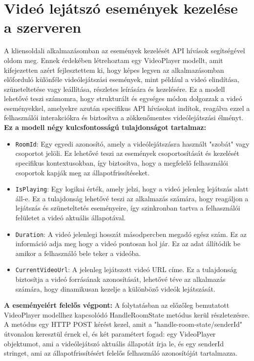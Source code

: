 \section{Videó lejátszó események kezelése a szerveren}
A kliensoldali alkalmazásomban az események kezelését API hívások segítségével oldom meg. Ennek érdekében létrehoztam egy VideoPlayer modellt, amit kifejezetten azért fejlesztettem ki, hogy képes legyen az alkalmazásomban előforduló különféle videólejátszási események, mint például a videó elindítása, szüneteltetése vagy leállítása, részletes leírására és kezelésére. Ez a modell lehetővé teszi számomra, hogy strukturált és egységes módon dolgozzak a videó eseményekkel, amelyekre azután specifikus API hívásokat indítok, reagálva ezzel a felhasználói interakciókra és biztosítva a zökkenőmentes videólejátszási élményt.
\vspace{1em}
\\
\textbf{Ez a modell négy kulcsfontosságú tulajdonságot tartalmaz:}
\begin{itemize}
\item \texttt{RoomId}: Egy egyedi azonosító, amely a videólejátszásra használt "szobát" vagy csoportot jelöli. Ez lehetővé teszi az események csoportosítását és kezelését specifikus kontextusokban, így biztosítva, hogy a megfelelő felhasználói csoportok kapják meg az állapotfrissítéseket.

\item \texttt{IsPlaying}: Egy logikai érték, amely jelzi, hogy a videó jelenleg lejátszás alatt áll-e. Ez a tulajdonság lehetővé teszi az alkalmazás számára, hogy reagáljon a lejátszás és szüneteltetés eseményeire, így szinkronban tartva a felhasználói felületet a videó aktuális állapotával.

\item \texttt{Duration}: A videó jelenlegi hosszát másodpercben megadó egész szám. Ez az információ adja meg hogy a videó pontosan hol jár. Ez az adat állítódik be amikor a felhasználó bele teker a videóba.

\item \texttt{CurrentVideoUrl}: A jelenleg lejátszott videó URL címe. Ez a tulajdonság biztosítja a videó forrásának azonosítását, lehetővé téve az alkalmazás számára, hogy dinamikusan kezelje a különböző videók lejátszását.
\end{itemize}
\textbf{A eseményeiért felelős végpont:}
A folytatásban az előzőleg bemutatott VideoPlayer modellhez kapcsolódó HandleRoomState metódus kerül részletezésre. A metódus egy HTTP POST kérést kezel, amit a "handle-room-state/{senderId}" útvonalon keresztül érnek el, és két paramétert fogad: egy VideoPlayer objektumot, ami a videólejátszó aktuális állapotát írja le, és egy senderId stringet, ami az állapotfrissítésért felelős felhasználó azonosítóját tartalmazza.
